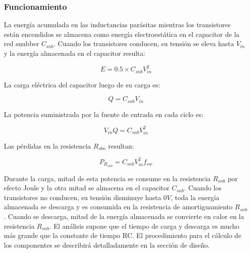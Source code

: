 \subsubsection{Funcionamiento}

La energía acumulada en las inductancias parásitas mientras los transistores están encendidos se almacena como energía electroestática en el capacitor de la red snubber $C_{snb}$. 
Cuando los transistores conducen, su tensión se eleva hasta $V_{in}$ y la energía almacenada en el capacitor resulta: 

$$ E=0.5\times C_{snb}V_{in}^{2} $$

La carga eléctrica del capacitor luego de su carga es:

$$ Q=C_{snb}V_{in} $$

La potencia suministrada por la fuente de entrada en cada ciclo es:

$$ V_{in}Q=C_{snb}V_{in}^{2} $$

Las pérdidas en la resistencia $R_{sbn}$ resultan:

$$ P_{R_{snb}}=C_{snb}V_{in}^{2}f_{sw} $$

Durante la carga, mitad de esta potencia se consume en la resistencia $R_{snb}$ por efecto Joule y la otra mitad se almacena en el capacitor $C_{snb}$. 
Cuando los transistores no conducen, su tensión disminuye hasta $0V$, toda la energía almacenada se descarga y es consumida en la resistencia de amortiguamiento $R_{snb}$.
Cuando se descarga, mitad de la energía almacenada se convierte en calor en la resistencia $R_{snb}$. 
El análisis supone que el tiempo de carga y descarga es mucho más grande que la constante de tiempo RC. 
El procedimiento para el cálculo de los componentes se describirá detalladamente en la sección de diseño.
